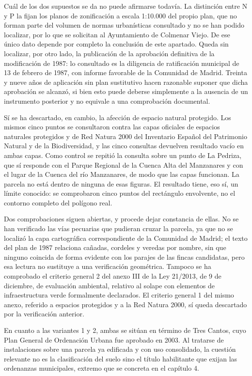 Cuál de los dos supuestos se da no puede afirmarse todavía. La distinción entre N y P la fijan los planos de zonificación a escala 1:10.000 del propio plan, que no forman parte del volumen de normas urbanísticas consultado y no se han podido localizar, por lo que se solicitan al Ayuntamiento de Colmenar Viejo. De ese único dato depende por completo la conclusión de este apartado. Queda sin localizar, por otro lado, la publicación de la aprobación definitiva de la modificación de 1987: lo consultado es la diligencia de ratificación municipal de 13 de febrero de 1987, con informe favorable de la Comunidad de Madrid. Treinta y nueve años de aplicación sin plan sustitutivo hacen razonable suponer que dicha aprobación se alcanzó, si bien esto puede deberse simplemente a la ausencia de un instrumento posterior y no equivale a una comprobación documental.

Sí se ha descartado, en cambio, la afección de espacio natural protegido. Los mismos cinco puntos se consultaron contra las capas oficiales de espacios naturales protegidos y de Red Natura 2000 del Inventario Español del Patrimonio Natural y de la Biodiversidad, y las cinco consultas devuelven resultado vacío en ambas capas. Como control se repitió la consulta sobre un punto de La Pedriza, que sí responde con el Parque Regional de la Cuenca Alta del Manzanares y con el lugar de la Cuenca del río Manzanares, de modo que las capas funcionan. La parcela no está dentro de ninguna de esas figuras. El resultado tiene, eso sí, un límite conocido: se comprobaron cinco puntos del rectángulo envolvente, no el contorno completo del polígono real.

Dos comprobaciones siguen abiertas, y procede dejar constancia de ellas. No se han verificado las vías pecuarias que pudieran cruzar la parcela, ya que no se localizó la capa cartográfica correspondiente de la Comunidad de Madrid; el texto del plan de 1987 relaciona cañadas, cordeles y veredas por nombre, sin que ninguno coincida de forma evidente con los parajes de las fincas candidatas, pero esa lectura no sustituye a una verificación geométrica. Tampoco se ha comprobado el criterio general 2 del anexo III de la Ley 21/2013, de 9 de diciembre, de evaluación ambiental, relativo al solape con elementos de infraestructura verde formalmente declarados. El criterio general 1 del mismo anexo, referido a espacios protegidos y a la Red Natura 2000, sí queda descartado por la verificación anterior.

En cuanto a las variantes 1 y 2, ambas se sitúan en término de Tres Cantos, cuyo Plan General de Ordenación Urbana fue aprobado en 2003. Al tratarse de instalaciones sobre una parcela ya edificada y con uso consolidado, la cuestión relevante no es la clasificación del suelo sino el título habilitante que exijan las ordenanzas municipales, extremo que se concreta en el capítulo 4.

